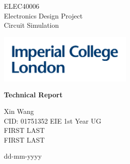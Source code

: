 \documentclass[12pt,a4paper]{article}
\begin{document}
\begin{titlepage}
	\clearpage\thispagestyle{empty}
	\centering
	\vspace{1cm}

	{\normalsize ELEC40006 \\ 
		Electronics Design Project\\
		Circuit Simulation\par}
		\vspace{2cm}
	\centering \includegraphics[width=0.5\textwidth]{Logo.jpg}
	\vspace{2cm}

	{\Huge \textbf{Technical Report}} \\
	\vspace{4cm}
	{\normalsize Xin Wang\\ CID: 01751352 EIE 1st Year UG \\ \vspace{0.5cm}
	             FIRST LAST \\ \vspace{0.5cm}
	             FIRST LAST\par} \vspace{0.5cm}
	{\normalsize dd-mm-yyyy \par}
	
	\vfill
	\pagebreak
\end{titlepage}

\tableofcontents
\pagebreak

\begin{abstract}
This report describes the design and implementation of a program that is capable of performing a transient simulation
by calculating the node voltages at each successive instant in time. This program parses the netlist file
into a graph data structure, performs analysis using conductance matrices and outputs the results in a CSV format.

-- How accurate is it?
\par
-- Comaparison to commercial software?
\end{abstract}
\pagebreak
\end{document}
